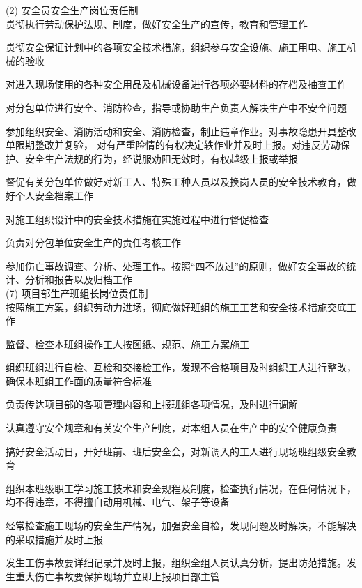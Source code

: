 (2) 安全员安全生产岗位责任制\\

 贯彻执行劳动保护法规、制度，做好安全生产的宣传，教育和管理工作

 贯彻安全保证计划中的各项安全技术措施，组织参与安全设施、施工用电、施工机械的验收

 对进入现场使用的各种安全用品及机械设备进行各项必要材料的存档及抽查工作

 对分包单位进行安全、消防检查，指导或协助生产负责人解决生产中不安全问题

 参加组织安全、消防活动和安全、消防检查，制止违章作业。对事故隐患开具整改单限期整改并复验，
对有严重险情的有权决定轶作业并及时上报。对违反劳动保护、安全生产法规的行为，经说服劝阻无效时，有权越级上报或举报

 督促有关分包单位做好对新工人、特殊工种人员以及换岗人员的安全技术教育，做好个人安全档案工作

 对施工组织设计中的安全技术措施在实施过程中进行督促检查

 负责对分包单位安全生产的责任考核工作

 参加伤亡事故调查、分析、处理工作。按照“四不放过”的原则，做好安全事故的统计、分析和报告以及归档工作\\

(7) 项目部生产班组长岗位责任制\\

 按照施工方案，组织劳动力进场，彻底做好班组的施工工艺和安全技术措施交底工作

 监督、检查本班组操作工人按图纸、规范、施工方案施工

 组织班组进行自检、互检和交接检工作，发现不合格项目及时组织工人进行整改，确保本班组工作面的质量符合标准

 负责传达项目部的各项管理内容和上报班组各项情况，及时进行调解

 认真遵守安全规章和有关安全生产制度，对本组人员在生产中的安全健康负责

 搞好安全活动日，开好班前、班后安全会，对新调入的工人进行现场班组级安全教育

 组织本班级职工学习施工技术和安全规程及制度，检查执行情况，在任何情况下，均不得违章，不得擅自动用机械、电气、架子等设备

 经常检查施工现场的安全生产情况，加强安全自检，发现问题及时解决，不能解决的采取措施并及时上报

 发生工伤事故要详细记录并及时上报，组织全组人员认真分析，提出防范措施。发生重大伤亡事故要保护现场并立即上报项目部主管\\


